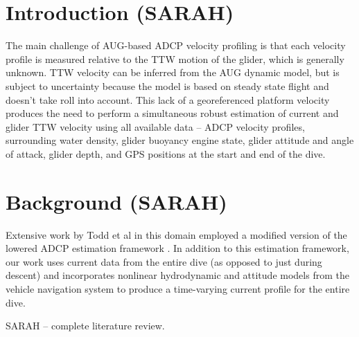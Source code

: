\section{Introduction \textbf(SARAH)}

The main challenge of AUG-based ADCP velocity profiling is that each velocity profile is measured relative to the TTW motion of the glider, which is generally unknown. TTW velocity can be inferred from the AUG dynamic model, but is subject to uncertainty because the model is based on steady state flight and doesn't take roll into account. This lack of a georeferenced platform velocity produces the need to perform a simultaneous robust estimation of current and glider TTW velocity using all available data -- ADCP velocity profiles, surrounding water density, glider buoyancy engine state, glider attitude and angle of attack, glider depth, and GPS positions at the start and end of the dive.

\section{Background \textbf(SARAH)}

Extensive work by Todd et al in this domain employed a modified version of the lowered ADCP estimation framework \cite{todd-2017-JAOT,todd-2011-JGRC}.  In addition to this estimation framework, our work uses current data from the entire dive (as opposed to just during descent) and incorporates nonlinear hydrodynamic and attitude models from the vehicle navigation system to produce a time-varying current profile for the entire dive.

SARAH -- complete literature review.
